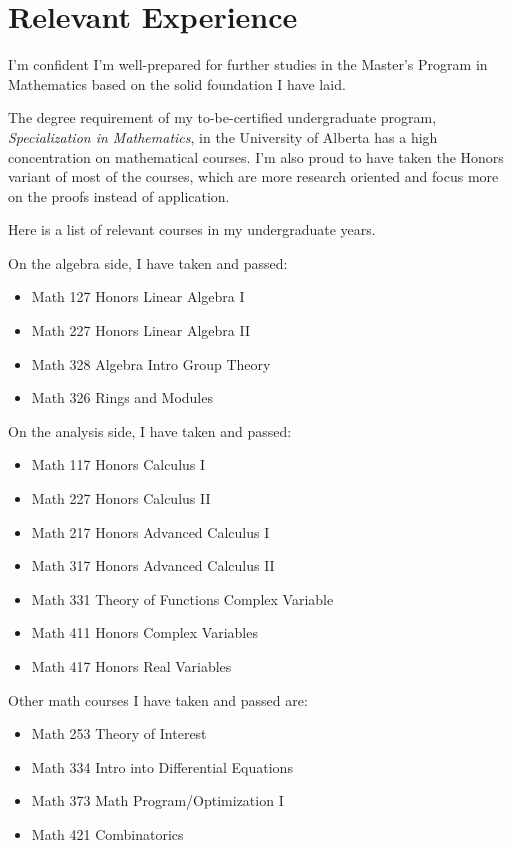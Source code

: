 \section*{Relevant Experience}



I'm confident I'm well-prepared for further studies in the Master's Program in Mathematics based on the solid foundation
I have laid.

The degree requirement of my to-be-certified undergraduate program, \textit{Specialization in Mathematics},
in the University of Alberta has a high concentration on mathematical courses.
I'm also proud to have taken the Honors variant of most of the courses,
which are more research oriented and focus more on the proofs instead of application.

Here is a list of relevant courses in my undergraduate years.

On the algebra side, I have taken and passed:

\begin{itemize}
    \item Math 127 Honors Linear Algebra I
    \item Math 227 Honors Linear Algebra II
    \item Math 328 Algebra Intro Group Theory
    \item Math 326 Rings and Modules
\end{itemize}

On the analysis side, I have taken and passed:

\begin{itemize}
    \item Math 117 Honors Calculus I
    \item Math 227 Honors Calculus II
    \item Math 217 Honors Advanced Calculus I
    \item Math 317 Honors Advanced Calculus II
    \item Math 331 Theory of Functions Complex Variable
    \item Math 411 Honors Complex Variables
    \item Math 417 Honors Real Variables
\end{itemize}

Other math courses I have taken and passed are:

\begin{itemize}
    \item Math 253 Theory of Interest
    \item Math 334 Intro into Differential Equations
    \item Math 373 Math Program/Optimization I
    \item Math 421 Combinatorics
\end{itemize}

